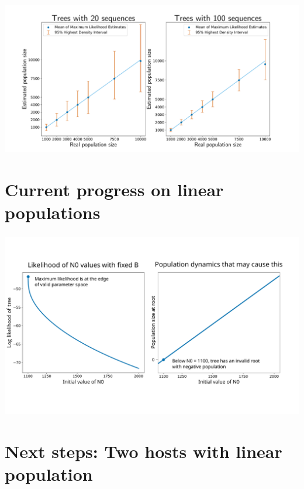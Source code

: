 \documentclass[aspectratio=169]{beamer}
\begin{document}
\begin{frame} \frametitle{\insertsection}

    \centering\includegraphics[width=\textwidth]{images/constant-accuracy}

\end{frame}

\section{Current progress on linear populations}

\begin{frame} \frametitle{\insertsection}

    \centering\includegraphics[width=\textwidth]{images/linear-progress}

\end{frame}

\section{Next steps: Two hosts with linear population}
\end{document}
